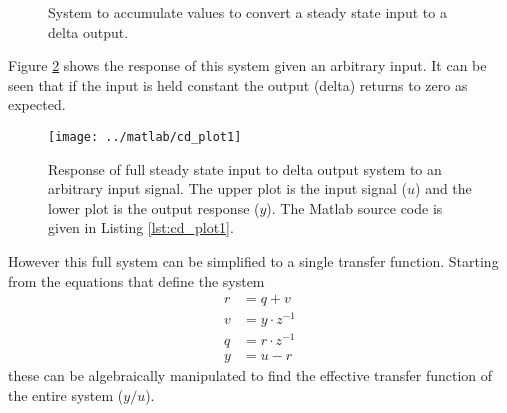 \documentclass{article}
\begin{document}
\begin{figure}[hpb!]
\begin{center}


\end{center}

\caption{System to accumulate values to convert a steady state
input to a delta output.}
\label{fig:cd1}
\end{figure}


Figure \ref{fig:cd_plot1} shows the response of this system given
an arbitrary input.
It can be seen that if the input is held constant the output (delta)
returns to zero as expected.

\begin{figure}[htbp!]
\texttt{[image: ../matlab/cd\_plot1]}
\caption{Response of full steady state input to delta output system
to an arbitrary input signal.
The upper plot is the input signal ($u$) and the lower plot is
the output response ($y$).
The Matlab source code is given in Listing \ref{lst:cd_plot1}.
}
\label{fig:cd_plot1}
\end{figure}

\begin{samepage}
However this full system can be simplified to a single transfer function.
Starting from the equations that define the system
\begin{align}
	r &= q + v \label{eq:cd1a} \\
	v &= y \cdot z^{-1} \label{eq:cd1b} \\
	q &= r \cdot z^{-1} \label{eq:cd1c} \\
	y &= u - r \label{eq:cd1d}
\end{align}
these can be algebraically manipulated to find the effective transfer
function of the entire system ($y/u$).
\end{samepage}
\end{document}

